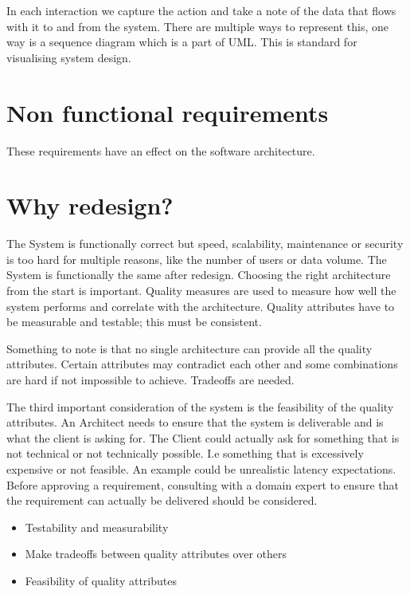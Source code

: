 \documentclass[a4paper, 11pt]{book}
\begin{document}
    In each interaction we capture the action and take a note of the data that flows with it to and from the system.
    There are multiple ways to represent this, one way is a sequence diagram which is a part of UML. This is standard for visualising system design.


    \section{Non functional requirements}
    These requirements have an effect on the software architecture.


    \section{Why redesign?}
    The System is functionally correct but speed, scalability, maintenance or security is too hard for multiple reasons, like the number of users or data volume.
    The System is functionally the same after redesign.
    Choosing the right architecture from the start is important.
    Quality measures are used to measure how well the system performs and correlate with the architecture.
    Quality attributes have to be measurable and testable; this must be consistent.

    Something to note is that no single architecture can provide all the quality attributes.
    Certain attributes may contradict each other and some combinations are hard if not impossible to achieve.
    Tradeoffs are needed.

    The third important consideration of the system is the feasibility of the quality attributes.
    An Architect needs to ensure that the system is deliverable and is what the client is asking for.
    The Client could actually ask for something that is not technical or not technically possible.
    I.e something that is excessively expensive or not feasible.
    An example could be unrealistic latency expectations.
    Before approving a requirement, consulting with a domain expert to ensure that the requirement can actually be delivered should be considered.

    \begin{itemize}
        \item Testability and measurability
        \item Make tradeoffs between quality attributes over others
        \item Feasibility of quality attributes
    \end{itemize}
\end{document}
